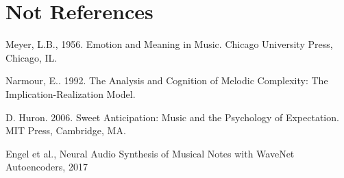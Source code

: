 \documentclass[final,authoryear,5p,times,twocolumn]{elsarticle}
\begin{document}













\section*{Not References}

 
Meyer, L.B., 1956. Emotion and Meaning in Music. Chicago University Press, Chicago, IL.

Narmour, E.. 1992. The Analysis and Cognition of Melodic Complexity: The Implication-Realization Model.

D. Huron. 2006. Sweet Anticipation: Music and the Psychology of Expectation. MIT Press, Cambridge, MA.

Engel et al., Neural Audio Synthesis of Musical Notes with WaveNet Autoencoders, 2017
\end{document}
